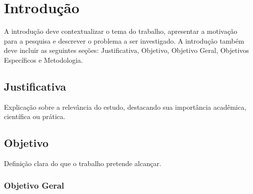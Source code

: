 


\chapter[Introdução]{Introdução} \label{ch:introducao}

A introdução deve contextualizar o tema do trabalho, apresentar a motivação para a pesquisa e descrever o problema a ser investigado. A introdução também deve incluir as seguintes seções: Justificativa, Objetivo, Objetivo Geral, Objetivos Específicos e Metodologia.



\section{Justificativa} \label{sec:justificativa}
Explicação sobre a relevância do estudo, destacando sua importância acadêmica, científica ou prática.


\section{Objetivo} \label{sec:objetivo}

Definição clara do que o trabalho pretende alcançar.


\subsection{Objetivo Geral} \label{sec:objetivo-geral}

